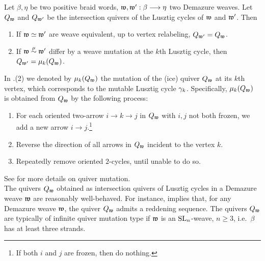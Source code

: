 \begin{fcor}\label{cor:quiver_cycles_weave_operations}
Let $\beta,\eta$ be two positive braid words, $\mathfrak{w},\mathfrak{w}':\beta\longrightarrow\eta$ two Demazure weaves. Let $Q_{\mathfrak{w}}$ and $Q_{\mathfrak{w}'}$ be the intersection quivers of the Lusztig cycles of $\mathfrak{w}$ and $\mathfrak{w}'$. Then

\begin{enumerate}
    \item If $\mathfrak{w}\simeq\mathfrak{w}'$ are weave equivalent, up to vertex relabeling, $Q_{\mathfrak{w}'}=Q_{\mathfrak{w}}$.
    
    \item If $\mathfrak{w}\stackrel{\mu}{\sim}\mathfrak{w}'$ differ by a weave mutation at the $k$th Lusztig cycle, then $Q_{\mathfrak{w}'}=\mu_k(Q_{\mathfrak{w}})$.
\end{enumerate}
\end{fcor}
\vspace{0.2cm}
\noindent In .(2) we denoted by $\mu_k(Q_{\mathfrak{w}})$ the mutation of the (ice) quiver $Q_{\mathfrak{w}}$ at its $k$th vertex, which corresponds to the mutable Lusztig cycle $\gamma_k$. Specifically, $\mu_k(Q_{\mathfrak{w}})$ is obtained from $Q_{\mathfrak{w}}$ by the following process:
\begin{enumerate}
    \item For each oriented two-arrow $i \to k \to j$ in $Q_{\mathfrak{w}}$ with $i,j$ not both frozen, we add a new arrow $i \to j$.\footnote{If both $i$ and $j$ are frozen, then do nothing.}
    \item Reverse the direction of all arrows in $Q_{\mathfrak{w}}$ incident to the vertex $k$.
    \item Repeatedly remove oriented $2$-cycles, until unable to do so.
\end{enumerate}
\noindent See \cite[Section 2]{FWZ16} for more details on quiver mutation.\\

\noindent The quivers $Q_{\mathfrak{w}}$ obtained as intersection quivers of Lusztig cycles in a Demazure weave $\mathfrak{w}$ are reasonably well-behaved. For instance, \cite[Proposition 7.10]{CGGLSS25} implies that, for any Demazure weave $\mathfrak{w}$, the quiver $Q_{\mathfrak{w}}$ admits a reddening sequence. The quivers $Q_{\mathfrak{w}}$ are typically of infinite quiver mutation type if $\mathfrak{w}$ is an $\operatorname{SL}_n$-weave, $n\geq3$, i.e.~$\beta$ has at least three strands.


